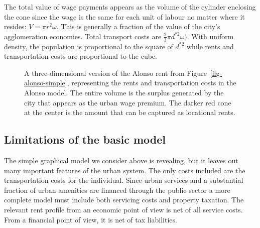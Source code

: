 The total value of wage payments appears as the volume of the cylinder enclosing the cone since the wage is the same for each unit of labour no matter where it resides: 
$V=\pi r^2 \omega$. This is generally a fraction of the value of the city's agglomeration economies. 
Total transport costs are $\frac{2}{3}\pi  d^{*2} \omega).$
With uniform density, the population is proportional to the square of  $d^{*2}$ while rents and transportation costs are proportional to the cube. %


\begin{figure}
    \begin{center}
    
    \caption[A three-dimensional version of the Alonso model.]{A three-dimensional version of the Alonso rent from Figure~\ref{fig-alonso-simple}, representing the rents and transportation costs in the Alonso model. The entire volume is the surplus generated by the city that appears as the urban wage premium. The darker red cone at the center is the amount that can be captured as locational rents.}
    \label{fig-city-conical}
    \end{center}
\end{figure}


 
\subsection{Limitations of the basic model}
The simple graphical model we consider above is revealing, but it leaves out many important features of the urban system. The only costs included are the transportation costs for the individual.  Since urban services and  a substantial fraction of urban amenities are financed through the public sector a more complete model must include both servicing costs and property taxation. The relevant rent profile from an economic point of view is net of all service costs. From a financial point of view, it is net of tax liabilities.%


